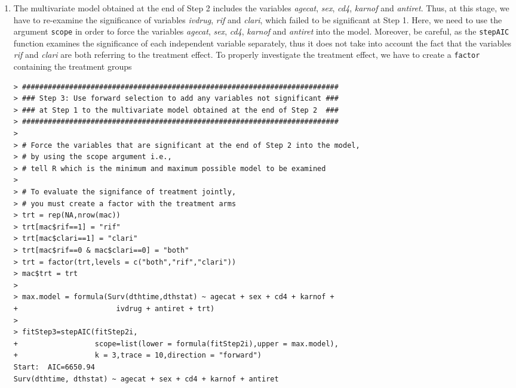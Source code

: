 \begin{enumerate}[(a)]
\begin{enumerate}[Step 1:]
\begin{enumerate}[(i)]
\begin{spacing}{1.2}
\begin{footnotesize}
\begin{verbatim}
trying - agecat
trying - sex
trying - cd4
trying - karnof
trying - antiret
          Df    AIC
<none>       6650.9
- sex      1 6652.2
- antiret  1 6653.2
- agecat   1 6662.4
- karnof   1 6701.2
- cd4      1 6702.3
\end{verbatim}
\end{footnotesize}
\end{spacing}
Note that the choice of \verb|k=3| in the calculation of \emph{AIC} is roughly equivalent to using a 5\% significance level in a likelihood ratio test that compares two nested models which differ by between one and three parameters (see section 3.6.1 in Collet). We can see that there is no variable eliminated from the model, as each elimination leads to an increased value of \emph{AIC}.
\end{enumerate}
\item The multivariate 
model obtained at the end of Step 2 includes the variables \emph{agecat}, \emph{sex}, \emph{cd4}, \emph{karnof} and \emph{antiret}. Thus, at this stage, we have to re-examine the significance of variables \emph{ivdrug}, \emph{rif} and \emph{clari}, which failed to be significant at Step 1. Here, we need to use the argument \verb|scope| in order to force the variables \emph{agecat}, \emph{sex}, \emph{cd4}, \emph{karnof} and \emph{antiret} into the model. 
Moreover, be careful, as the \verb|stepAIC| function examines the significance of each independent variable separately, thus it does not take into account the fact that the variables \emph{rif} and \emph{clari} are both referring to the treatment effect. To properly investigate the treatment effect, we have to create a \verb|factor| containing the treatment groups 
\begin{spacing}{1.2}
\begin{footnotesize}
\begin{verbatim}
> ##########################################################################
> ### Step 3: Use forward selection to add any variables not significant ###
> ### at Step 1 to the multivariate model obtained at the end of Step 2  ###                     
> ##########################################################################
> 
> # Force the variables that are significant at the end of Step 2 into the model,
> # by using the scope argument i.e.,
> # tell R which is the minimum and maximum possible model to be examined
> 
> # To evaluate the signifance of treatment jointly, 
> # you must create a factor with the treatment arms
> trt = rep(NA,nrow(mac))
> trt[mac$rif==1] = "rif"
> trt[mac$clari==1] = "clari"
> trt[mac$rif==0 & mac$clari==0] = "both"
> trt = factor(trt,levels = c("both","rif","clari"))
> mac$trt = trt
> 
> max.model = formula(Surv(dthtime,dthstat) ~ agecat + sex + cd4 + karnof + 
+                       ivdrug + antiret + trt)
> 
> fitStep3=stepAIC(fitStep2i,
+                  scope=list(lower = formula(fitStep2i),upper = max.model),
+                  k = 3,trace = 10,direction = "forward")
Start:  AIC=6650.94
Surv(dthtime, dthstat) ~ agecat + sex + cd4 + karnof + antiret


\end{verbatim}
\end{footnotesize}
\end{spacing}
\end{enumerate}
\end{enumerate}
